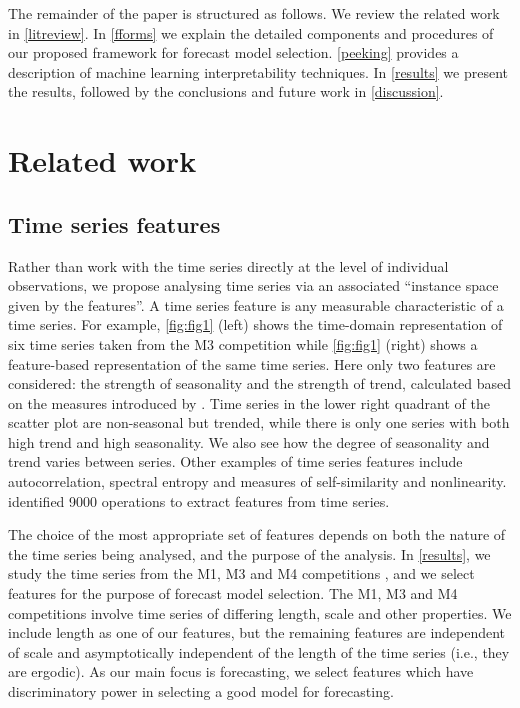 \documentclass[11pt,a4paper,]{article}
\begin{document}
The remainder of the paper is structured as follows. We review the related work in \autoref{litreview}. In \autoref{fforms} we explain the detailed components and procedures of our proposed framework for forecast model selection. \autoref{peeking} provides a description of machine learning interpretability techniques. In \autoref{results} we present the results, followed by the conclusions and future work in \autoref{discussion}.

\hypertarget{litreview}{%
\section{Related work}\label{litreview}}

\hypertarget{time-series-features}{%
\subsection{Time series features}\label{time-series-features}}

Rather than work with the time series directly at the level of individual observations, we propose analysing time series via an associated ``instance space given by the features''. A time series feature is any measurable characteristic of a time series. For example, \autoref{fig:fig1} (left) shows the time-domain representation of six time series taken from the M3 competition \autocite{makridakis2000m3} while \autoref{fig:fig1} (right) shows a feature-based representation of the same time series. Here only two features are considered: the strength of seasonality and the strength of trend, calculated based on the measures introduced by \textcite{wang2009rule}. Time series in the lower right quadrant of the scatter plot are non-seasonal but trended, while there is only one series with both high trend and high seasonality. We also see how the degree of seasonality and trend varies between series. Other examples of time series features include autocorrelation, spectral entropy and measures of self-similarity and nonlinearity. \textcite{fulcher2014highly} identified 9000 operations to extract features from time series.

The choice of the most appropriate set of features depends on both the nature of the time series being analysed, and the purpose of the analysis. In \autoref{results}, we study the time series from the M1, M3 and M4 competitions \autocites{makridakis1982accuracy}{makridakis2000m3}{makridakis2019m4}, and we select features for the purpose of forecast model selection. The M1, M3 and M4 competitions involve time series of differing length, scale and other properties. We include length as one of our features, but the remaining features are independent of scale and asymptotically independent of the length of the time series (i.e., they are ergodic). As our main focus is forecasting, we select features which have discriminatory power in selecting a good model for forecasting.
\end{document}
